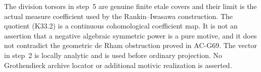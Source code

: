 \begin{remark}
The division torsors in step~5 are genuine finite etale
covers and their limit is the actual measure coefficient
used by the Rankin--Iwasawa construction.  The quotient
(K33.2) is a continuous cohomological coefficient map.
It is not an assertion that a negative algebraic symmetric
power is a pure motive, and it does not contradict the
geometric de Rham obstruction proved in AC-G69.
The vector in step~2 is locally analytic and is used
before ordinary projection.  No Grothendieck archive
locator or additional motivic realization is asserted.
\end{remark}
